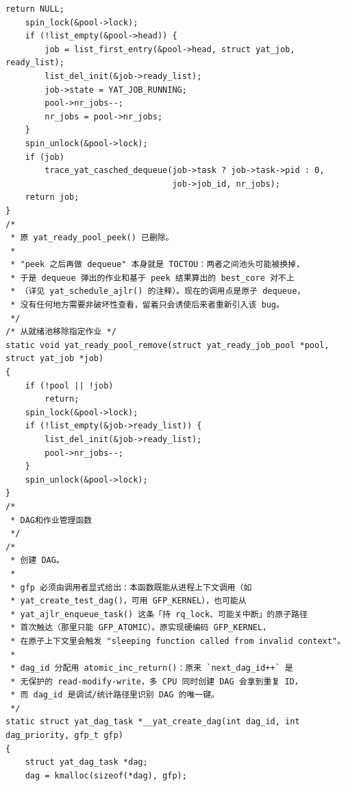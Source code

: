 \documentclass[10pt,a4paper]{article}
\newenvironment{yatpage}{\vspace*{0pt}}{\par}
\begin{document}
\begin{yatpage}
\begin{Verbatim}[fontsize=\fontsize{8.2}{9.8}\selectfont]
        return NULL;
    spin_lock(&pool->lock);
    if (!list_empty(&pool->head)) {
        job = list_first_entry(&pool->head, struct yat_job, ready_list);
        list_del_init(&job->ready_list);
        job->state = YAT_JOB_RUNNING;
        pool->nr_jobs--;
        nr_jobs = pool->nr_jobs;
    }
    spin_unlock(&pool->lock);
    if (job)
        trace_yat_casched_dequeue(job->task ? job->task->pid : 0,
                                  job->job_id, nr_jobs);
    return job;
}
/*
 * 原 yat_ready_pool_peek() 已删除。
 *
 * "peek 之后再做 dequeue" 本身就是 TOCTOU：两者之间池头可能被换掉，
 * 于是 dequeue 弹出的作业和基于 peek 结果算出的 best_core 对不上
 * （详见 yat_schedule_ajlr() 的注释）。现在的调用点是原子 dequeue，
 * 没有任何地方需要非破坏性查看，留着只会诱使后来者重新引入该 bug。
 */
/* 从就绪池移除指定作业 */
static void yat_ready_pool_remove(struct yat_ready_job_pool *pool, struct yat_job *job)
{
    if (!pool || !job)
        return;
    spin_lock(&pool->lock);
    if (!list_empty(&job->ready_list)) {
        list_del_init(&job->ready_list);
        pool->nr_jobs--;
    }
    spin_unlock(&pool->lock);
}
/*
 * DAG和作业管理函数
 */
/*
 * 创建 DAG。
 *
 * gfp 必须由调用者显式给出：本函数既能从进程上下文调用（如
 * yat_create_test_dag()，可用 GFP_KERNEL），也可能从
 * yat_ajlr_enqueue_task() 这条「持 rq_lock、可能关中断」的原子路径
 * 首次触达（那里只能 GFP_ATOMIC）。原实现硬编码 GFP_KERNEL，
 * 在原子上下文里会触发 "sleeping function called from invalid context"。
 *
 * dag_id 分配用 atomic_inc_return()：原来 `next_dag_id++` 是
 * 无保护的 read-modify-write，多 CPU 同时创建 DAG 会拿到重复 ID，
 * 而 dag_id 是调试/统计路径里识别 DAG 的唯一键。
 */
static struct yat_dag_task *__yat_create_dag(int dag_id, int dag_priority, gfp_t gfp)
{
    struct yat_dag_task *dag;
    dag = kmalloc(sizeof(*dag), gfp);
\end{Verbatim}
\end{yatpage}
\newpage
\end{document}

